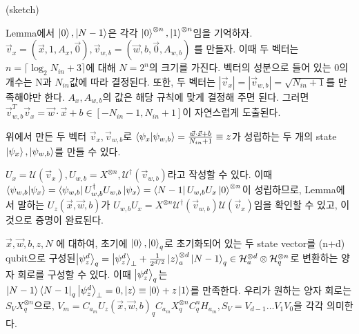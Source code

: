 \begin{pf}(sketch)

Lemma에서 \(\ket{0}, \ket{N-1}\)은 각각 \(\ket{0}^{\otimes n}, \ket{1}^{\otimes n}\)임을 기억하자.
\(\vec{v}_x = (\vec{x},1,A_x,\vec{0}), \vec{v}_{w,b} = (\vec{w},b,\vec{0},A_{w,b})\) 를 만들자.
이때 두 벡터는 \(n = \lceil\log_2{N_{in}+3}\rceil\)에 대해 \(N = 2^n\)의 크기를 가진다. 벡터의 성분으로 들어 있는 0의 개수는 N과 \(N_{in}\)값에 따라 결정된다.
또한, 두 벡터는 \(|\vec{v}_x| = |\vec{v}_{w,b}| = \sqrt{N_{in}+1}\)를 만족해야만 한다. \(A_x, A_{w,b}\)의 값은 해당 규칙에 맞게 결정해 주면 된다.
그러면 \(\vec{v}_{w,b}^T\vec{v}_{x} = \vec{w}\cdot\vec{x}+b \in [-N_{in}-1, N_{in}+1]\)이 자연스럽게 도출된다.


위에서 만든 두 벡터 \(\vec{v}_x, \vec{v}_{w,b}\)로 \(\bra{\psi_x}\ket{\psi_{w,b}} = \frac{\vec{w}\cdot\vec{x}+b}{N_{in}+1} \equiv z\)가 성립하는 두 개의 state \(\ket{\psi_{x}},\ket{\psi_{w,b}}\)를 만들 수 있다.

\(U_x = \mathcal{U}(\vec{v}_x), U_{w,b} = X^{\otimes n}, \mathcal{U}^\dag(\vec{v}_{w,b})\)라고 작성할 수 있다.
이때 \(\bra{\psi_{w,b}}\ket{\psi_x} = \bra{\psi_{w,b}}U_{w,b}^{\dag} U_{w,b}\ket{\psi_x} = \bra{N-1}U_{w,b}U_x\ket{0}^{\otimes n}\)이 성립하므로, Lemma에서 말하는 \(U_z(\vec{x},\vec{w},b)\)가 \(U_{w,b}U_x = X^{\otimes n}\mathcal{U}^\dag (\vec{v}_{w,b})\mathcal{U}(\vec{v}_x)\)임을 확인할 수 있고, 이것으로 증명이 완료된다.
\end{pf}

\begin{theorem}
    \(\vec{x}, \vec{w},b,z, N\) 에 대하여, 초기에 \(\ket{0}, \ket{0}_q\)로 초기화되어 있는 두 state vector를 (n+d) qubit으로 구성된\(\ket{\psi_z^d}_q = \ket{\psi_z^d}_\perp + \frac{1}{2^{d/2}}\ket{z}_a^{\otimes d}\ket{N-1}_q \in \mathcal{H}_a^{\otimes d} \otimes \mathcal{H}_q^{\otimes n} \)로 변환하는 양자 회로를 구성할 수 있다.
    이때 \(\ket{\psi_z^d}_q\)는 \(\ket{N-1} \bra{N-1}_q\ket{\psi_z^d}_\perp = 0, \ket{z} \equiv \ket{0}+z\ket{1}\)를 만족한다.
    우리가 원하는 양자 회로는 \(S_VX_q^{\otimes n}\)으로, \(V_m = C_{a_m}U_z(\vec{x},\vec{w},b)_qC_{a_m}X_q^{\otimes n}C_q^nH_{a_m}, S_V=V_{d-1}\dots V_1V_0\)을 각각 의미한다.
\end{theorem}

